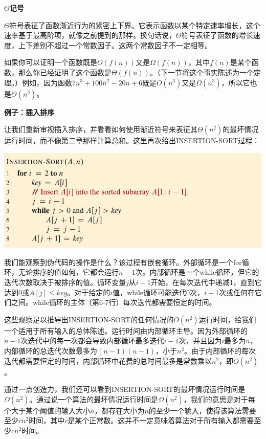 \documentclass[lang=cn,newtx,10pt,scheme=chinese]{elegantbook}
\begin{document}
\textbf{$\Theta$记号}

$\Theta$符号表征了函数渐近行为的紧密上下界。它表示函数以某个特定速率增长，这个速率基于最高阶项，就像之前提到的那样。换句话说，$\Theta$符号表征了函数的增长速度，上下差别不超过一个常数因子。这两个常数因子不一定相等。

如果你可以证明一个函数既是$O(f(n))$又是$\Omega(f(n))$，其中$f(n)$是某个函数，那么你已经证明了这个函数是$\Theta(f(n))$。（下一节将这个事实陈述为一个定理。）例如，因为函数$7 n^3+100 n^2-20 n+6$既是$O\left(n^3\right)$又是$\Omega\left(n^3\right)$，所以它也是$\Theta\left(n^3\right)$。

\textbf{例子：插入排序}

让我们重新审视插入排序，并看看如何使用渐近符号来表征其$\Theta\left(n^2\right)$的最坏情况运行时间，而不像第二章那样计算总和。这里再次给出INSERTION-SORT过程：

\includegraphics{算法导论第四版插图/第二章/插入排序伪代码.pdf}

我们能观察到伪代码的操作是什么？该过程有嵌套循环。外部循环是一个for循环，无论排序的值如何，它都会运行$n-1$次。内部循环是一个while循环，但它的迭代次数取决于被排序的值。循环变量$j$从$i-1$开始，在每次迭代中递减1，直到它达到0或$A[j]\leq key$。对于给定的$i$值，while循环可能迭代0次，$i-1$次或任何在它们之间。while循环的主体（第6-7行）每次迭代都需要恒定的时间。

这些观察足以推导出INSERTION-SORT的任何情况的$O\left(n^2\right)$运行时间，给我们一个适用于所有输入的总体陈述。运行时间由内部循环主导。因为外部循环的$n-1$次迭代中的每一次都会导致内部循环最多迭代$i-1$次，并且因为$i$最多为$n$，内部循环的总迭代次数最多为$(n-1)(n-1)$，小于$n^2$。由于内部循环的每次迭代都需要恒定的时间，内部循环中花费的总时间最多是常数乘以$n^2$，即$O\left(n^2\right)$。

通过一点创造力，我们还可以看到INSERTION-SORT的最坏情况运行时间是$\Omega\left(n^2\right)$。通过说一个算法的最坏情况运行时间是$\Omega\left(n^2\right)$，我们的意思是对于每个大于某个阈值的输入大小$n$，都存在大小为$n$的至少一个输入，使得该算法需要至少$c n^2$时间，其中$c$是某个正常数。这并不一定意味着算法对于所有输入都需要至少$c n^2$时间。
\end{document}
